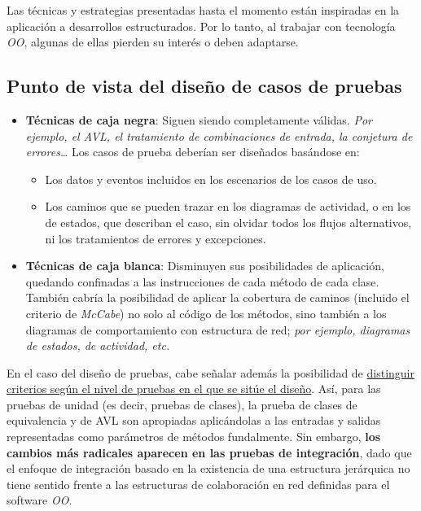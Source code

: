 Las técnicas y estrategias presentadas hasta el momento están inspiradas en la aplicación a desarrollos estructurados. Por lo tanto, al trabajar con tecnología \textit{OO}, algunas de ellas pierden su interés o deben adaptarse.\\

\subsection{Punto de vista del diseño de casos de pruebas}

\begin{itemize}
    \item \textbf{Técnicas de caja negra}: Siguen siendo completamente válidas. \textit{Por ejemplo, el AVL, el tratamiento de combinaciones de entrada, la conjetura de errores\ldots} Los casos de prueba deberían ser diseñados basándose en:
          \begin{itemize}
              \item Los datos y eventos incluidos en los escenarios de los casos de uso.
              \item Los caminos que se pueden trazar en los diagramas de actividad, o en los de estados, que describan el caso, sin olvidar todos los flujos alternativos, ni los tratamientos de errores y excepciones.
          \end{itemize}
    \item \textbf{Técnicas de caja blanca}: Disminuyen sus posibilidades de aplicación, quedando confinadas a las instrucciones de cada método de cada clase. También cabría la posibilidad de aplicar la cobertura de caminos (incluido el criterio de \textit{McCabe}) no solo al código de los métodos, sino también a los diagramas de comportamiento con estructura de red; \textit{por ejemplo, diagramas de estados, de actividad, etc.}
\end{itemize}

En el caso del diseño de pruebas, cabe señalar además la posibilidad de \uline{distinguir criterios según el nivel de pruebas en el que se sitúe el diseño}. Así, para las pruebas de unidad (es decir, pruebas de clases), la prueba de clases de equivalencia y de AVL  son apropiadas aplicándolas a las entradas y salidas representadas como parámetros de métodos fundalmente. Sin embargo, \textbf{los cambios más radicales aparecen en las pruebas de integración}, dado que el enfoque de integración basado en la existencia de una estructura jerárquica no tiene sentido frente a las estructuras de colaboración en red definidas para el software \textit{OO}.\\

